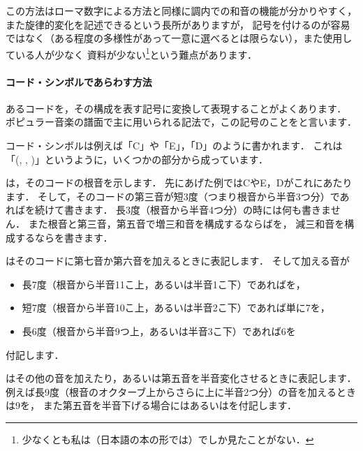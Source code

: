 \documentclass[dvipdfmx,uplatex,b5paper,openany,jbase=12Q,nomag*,textwidth-limit=44%
               ]{gachimuchi}[2020/05/05]
\begin{document}
この方法はローマ数字による方法と同様に調内での和音の機能が分かりやすく，
また旋律的変化を記述できるという長所がありますが，
記号を付けるのが容易ではなく（ある程度の多様性があって一意に選べるとは限らない），また使用している人が少なく
資料が少ない\footnote{
  少なくとも私は（日本語の本の形では）でしか見たことがない．
}という難点があります．

\paragraph{コード・シンボルであらわす方法}
あるコードを，その構成を表す記号に変換して表現することがよくあります．
ポピュラー音楽の譜面で主に用いられる記法で，この記号のことをと言います．

コード・シンボルは例えば「C」や「E\aFlat{}」，「D\Min{}」のように書かれます．
これは「\txCirc(\Min , \Dimt , \Aug)\lhsc\txSqr\txTri」というように，いくつかの部分から成っています．

\txCirc は，そのコードの根音を示します．
先にあげた例ではCやE\aFlat ，Dがこれにあたります．
そして，そのコードの第三音が短3度（つまり根音から半音3つ分）であれば\Min を続けて書きます．
長3度（根音から半音4つ分）の時には何も書きません．
また根音と第三音，第五音で増三和音を構成するならば\Aug を，
減三和音を構成するなら\Dimt を書きます．

\txSqr はそのコードに第七音か第六音を加えるときに表記します．
そして加える音が
\begin{itemize}
  \item 長7度（根音から半音11こ上，あるいは半音1こ下）であればを，
  \item 短7度（根音から半音10こ上，あるいは半音2こ下）であれば単に\subsc7を，
  \item 長6度（根音から半音9つ上，あるいは半音3こ下）であれば\subsc6を
\end{itemize}
付記します．

\txTri はその他の音を加えたり，あるいは第五音を半音変化させるときに表記します．
例えば長9度（根音のオクターブ上からさらに上に半音2つ分）の音を加えるときは\supsc9を，
また第五音を半音下げる場合にはあるいはを付記します．
\end{document}
